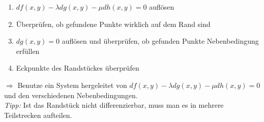 \documentclass[11pt]{article}
\begin{document}
\begin{enumerate}[noitemsep, label=\roman*]
	\item $df(x,y) - \lambda dg(x,y) - \mu dh(x,y) = 0$ aufl{\"o}sen
	\item {\"U}berpr{\"u}fen, ob gefundene Punkte wirklich auf dem Rand sind
	\item $dg(x,y) = 0$ aufl{\"o}sen und {\"u}berpr{\"u}fen, ob gefunden Punkte Nebenbedingung erf{\"u}llen
	\item Eckpunkte des Randst{\"u}ckes {\"u}berpr{\"u}fen
\end{enumerate}

$\Rightarrow$ Benutze ein System hergeleitet von $df(x,y) - \lambda dg(x,y) - \mu dh(x,y) = 0$ und den verschiedenen Nebenbedingungen. \\ 

\emph{Tipp:} Ist das Randst{\"u}ck nicht differenzierbar, muss man es in mehrere Teilstrecken aufteilen. \\
\end{document}
